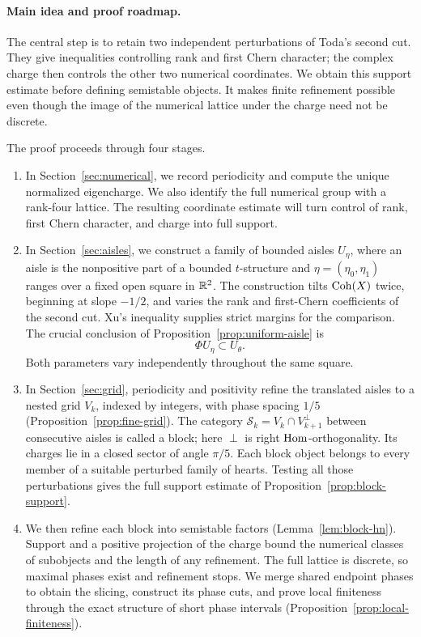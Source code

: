 \paragraph{Main idea and proof roadmap.}
The central step is to retain two independent perturbations of Toda's second
cut. They give inequalities controlling rank and first Chern character; the
complex charge then controls the other two numerical coordinates. We obtain
this support estimate before defining semistable objects. It makes finite
refinement possible even though the image of the numerical lattice under the
charge need not be discrete.

The proof proceeds through four stages.
\begin{enumerate}
\item In Section~\ref{sec:numerical}, we record periodicity and compute the
unique normalized eigencharge. We also identify the full numerical group
with a rank-four lattice. The resulting coordinate estimate will turn
control of rank, first Chern character, and charge into full support.

\item In Section~\ref{sec:aisles}, we construct a family of bounded aisles
$U_\eta$, where an aisle is the nonpositive part of a bounded
$t$-structure and $\eta=(\eta_0,\eta_1)$ ranges over a fixed open square in
$\mathbb R^2$. The construction tilts $\operatorname{Coh}(X)$ twice, beginning at slope
$-1/2$, and varies the rank and first-Chern coefficients of the second cut.
Xu's inequality supplies strict margins for the comparison. The crucial
conclusion of Proposition~\ref{prop:uniform-aisle} is
\[
 \Phi U_{\eta}\subset U_{\theta}.
\]
Both parameters vary independently throughout the same square.

\item In Section~\ref{sec:grid}, periodicity and positivity refine the
translated aisles to a nested grid $V_k$, indexed by integers, with phase
spacing $1/5$ (Proposition~\ref{prop:fine-grid}). The category
$\mathcal S_k=V_k\cap V_{k+1}^\perp$ between consecutive aisles is called
a block; here $\perp$ is right $\operatorname{Hom}$-orthogonality. Its charges lie in a
closed sector of angle $\pi/5$. Each block object belongs to every member
of a suitable perturbed family of hearts. Testing all those perturbations
gives the full support estimate of Proposition~\ref{prop:block-support}.

\item We then refine each block into semistable factors
(Lemma~\ref{lem:block-hn}). Support and a positive projection of the charge
bound the numerical classes of subobjects and the length of any refinement.
The full lattice is discrete, so maximal phases exist and refinement stops.
We merge shared endpoint phases to obtain the slicing, construct its phase
cuts, and prove local finiteness through the exact structure of short phase
intervals (Proposition~\ref{prop:local-finiteness}).
\end{enumerate}

